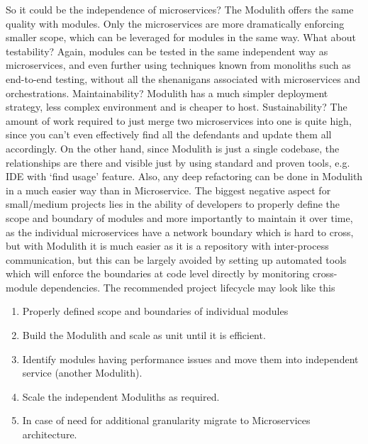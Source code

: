 So it could be the independence of microservices? The Modulith offers the same quality with modules. Only the microservices are more dramatically enforcing smaller scope, which can be leveraged for modules in the same way. What about testability? Again, modules can be tested in the same independent way as microservices, and even further using techniques known from monoliths such as end-to-end testing, without all the shenanigans associated with microservices and orchestrations. Maintainability? Modulith has a much simpler deployment strategy, less complex environment and is cheaper to host. Sustainability? The amount of work required to just merge two microservices into one is quite high, since you can't even effectively find all the defendants and update them all accordingly. On the other hand, since Modulith is just a single codebase, the relationships are there and visible just by using standard and proven tools, e.g. IDE with `find usage' feature. Also, any deep refactoring can be done in Modulith in a much easier way than in Microservice. The biggest negative aspect for small/medium projects lies in the ability of developers to properly define the scope and boundary of modules and more importantly to maintain it over time, as the individual microservices have a network boundary which is hard to cross, but with Modulith it is much easier as it is a repository with inter-process communication, but this can be largely avoided by setting up automated tools which will enforce the boundaries at code level directly by monitoring cross-module dependencies. The recommended project lifecycle may look like this


\begin{enumerate}
    \item Properly defined scope and boundaries of individual modules
    \item Build the Modulith and scale as unit until it is efficient.
    \item Identify modules having performance issues and move them into independent service (another Modulith).
    \item Scale the independent Moduliths as required.
    \item In case of need for additional granularity migrate to Microservices architecture.
\end{enumerate}

